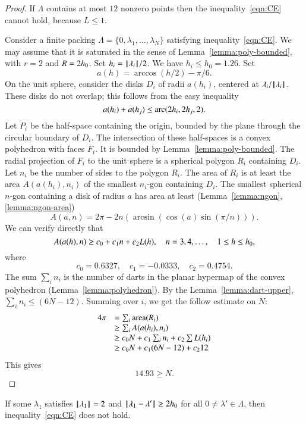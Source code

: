\begin{proof} If $\Lambda$ contains at most $12$ nonzero points then
the inequality~\ref{eqn:CE} cannot hold, because $L\le 1$.

Consider a finite packing $\Lambda=\{0,\lambda_1,\ldots,\lambda_N\}$ satisfying inequality~\ref{eqn:CE}.   We may assume that it is saturated in the sense of Lemma~\ref{lemma:poly-bounded}, with $r=2$ and $R=2{h_0}$.  Set $h_i = {{\hskip0.1em|\hskip-0.15em|\hskip0.1em}\lambda_i{\hskip0.1em|\hskip-0.15em|\hskip0.1em}}/2$.  We have $h_i\le h_0=1.26$.  Set
$$
a(h) = \arccos(h/2) - \pi/6.
$$
On the unit sphere,  consider the disks $D_i$ of radii $a(h_i)$, centered at $\lambda_i/{{\hskip0.1em|\hskip-0.15em|\hskip0.1em}\lambda_i{\hskip0.1em|\hskip-0.15em|\hskip0.1em}}$.  These disks do not overlap; this follows from the easy inequality~\cite[cc:disks]{hales:2009:nonlinear} %
$$
a(h_i) + a(h_j) \le {\operatorname{arc}}(2h_i,2h_j,2).
$$
Let $P_i$ be the half-space containing the origin, bounded by the plane through the circular boundary of $D_i$.  The intersection of these half-spaces is a convex polyhedron with faces $F_i$.  It is bounded by Lemma~\ref{lemma:poly-bounded}.   The radial projection of $F_i$ to the unit sphere is a spherical polygon $R_i$ containing $D_i$.  Let $n_i$ be the number of sides to the polygon $R_i$.  The area of $R_i$ is at least the area $A(a(h_i),n_i)$ of the smallest $n_i$-gon containing $D_i$.  The smallest spherical $n$-gon containing a disk of radius $a$ has area at least (Lemma~\ref{lemma:ngon}, \ref{lemma:ngon-area})
$$
A(a,n) = 2\pi - 2 n (\arcsin(\cos(a)\sin(\pi/n))).
$$
We can verify directly that~\cite[cc:alin]{hales:2009:nonlinear} %
$$
A(a(h),n) \ge c_0 + c_1 n + c_2 L(h),\quad
n = 3,4,\ldots,\quad 1\le h\le {h_0},
$$
where
$$c_0 = 0.6327,\quad c_1 = -0.0333,\quad c_2 = 0.4754.$$
The sum $\sum_i n_i$ is the number of darts in the planar hypermap of
the convex polyhedron (Lemma~\ref{lemma:polyhedron}).  By the Lemma~\ref{lemma:dart-upper}, 
$\sum_i n_i \le (6N-12)$.
Summing over $i$,  we get the follow
estimate on $N$:
$$
\begin{array}{lll}
4\pi &= \sum_i{\operatorname{area}}(R_i)\\
     &\ge \sum_i A(a(h_i),n_i) \\
     &\ge c_0 N +c_1\sum_i n_i + c_2 \sum L(h_i)\\
     &\ge c_0 N +c_1 (6N-12) + c_2 12\\
\end{array}
$$
This gives
$$
14.93 \ge N.
$$
\end{proof} 


\begin{lemma}\label{300}\label{lemma:D'}  
If some $\lambda_1$ satisfies ${{\hskip0.1em|\hskip-0.15em|\hskip0.1em}\lambda_1{\hskip0.1em|\hskip-0.15em|\hskip0.1em}}=2$ and
${\hskip0.1em|\hskip-0.15em|\hskip0.1em}\lambda_1 - \lambda'{\hskip0.1em|\hskip-0.15em|\hskip0.1em}\ge 2{h_0}$ for all $0\ne\lambda'\in\Lambda$,
then  inequality~\ref{eqn:CE} does not hold.
\end{lemma}

